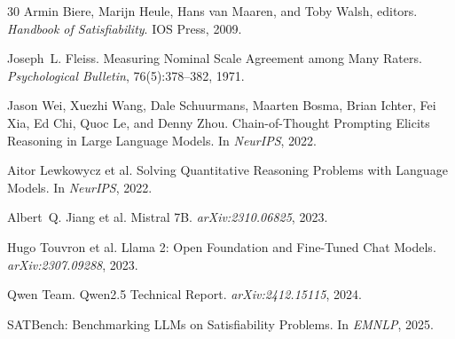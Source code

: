 \documentclass[11pt,a4paper]{article}
\begin{document}
\begin{thebibliography}{30}
Armin Biere, Marijn Heule, Hans van Maaren, and Toby Walsh, editors.
{\em Handbook of Satisfiability}.
IOS Press, 2009.

Joseph~L. Fleiss.
Measuring Nominal Scale Agreement among Many Raters.
{\em Psychological Bulletin}, 76(5):378--382, 1971.

Jason Wei, Xuezhi Wang, Dale Schuurmans, Maarten Bosma, Brian Ichter, Fei Xia, Ed Chi, Quoc Le, and Denny Zhou.
Chain-of-Thought Prompting Elicits Reasoning in Large Language Models.
In {\em NeurIPS}, 2022.

Aitor Lewkowycz et al.
Solving Quantitative Reasoning Problems with Language Models.
In {\em NeurIPS}, 2022.

Albert~Q. Jiang et al.
Mistral 7B.
{\em arXiv:2310.06825}, 2023.

Hugo Touvron et al.
Llama 2: Open Foundation and Fine-Tuned Chat Models.
{\em arXiv:2307.09288}, 2023.

Qwen Team.
Qwen2.5 Technical Report.
{\em arXiv:2412.15115}, 2024.

SATBench: Benchmarking LLMs on Satisfiability Problems.
In {\em EMNLP}, 2025.

\end{thebibliography}
\end{document}
